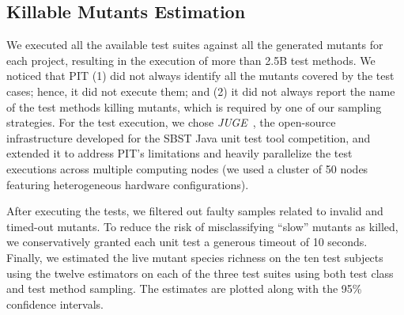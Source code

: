 \documentclass[sigconf,review,anonymous]{acmart}
\newcommand{\estimatorCount}{twelve\xspace}
\newcommand{\projectCount}{ten\xspace}
\newcommand{\PIT}{\textsc{PIT}\xspace}
\begin{document}
\subsection{Killable Mutants Estimation}
\label{sec:estimation}
%
We executed all the available test suites against all the generated mutants for each project, resulting in the execution of more than 2.5B test methods.
We noticed that \PIT
(1) did not always identify all the mutants covered by the test cases; hence, it did not execute them;
and (2) it did not always report the name of the test methods killing mutants, which is required by one of our sampling strategies.
%
For the test execution, we chose \emph{JUGE}~\cite{DBLP:journals/corr/abs-2106-07520},
the open-source infrastructure developed for the SBST Java unit test tool competition, and extended it to address \PIT's limitations and heavily parallelize the test executions across multiple computing nodes (we used a cluster of 50 nodes featuring heterogeneous hardware configurations).

After executing the tests, we
filtered out faulty samples related to invalid and timed-out mutants.
%
To reduce the risk of misclassifying ``slow'' mutants as killed,
we conservatively granted each unit test a generous timeout of 10 seconds.
%
%
Finally, we estimated the live mutant species richness
on the \projectCount test subjects using the \estimatorCount 
estimators on each of the three test suites using both test class and test method sampling.
%
The estimates are plotted along with the 95\% confidence intervals.
\end{document}
